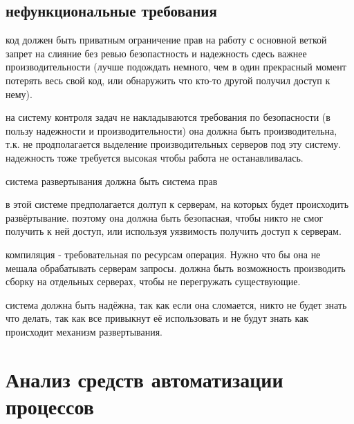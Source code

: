 \documentclass{article}
\begin{document}
\subsection{нефункциональные требования}
код должен быть приватным
ограничение прав на работу с основной веткой
запрет на слияние без ревью
безопастность и надежность сдесь важнее производительности (лучше подождать немного, чем в один прекрасный момент потерять весь свой код, или обнаружить что кто-то другой получил доступ к нему).

на систему контроля задач не накладываются требования по безопасности (в пользу надежности и производительности)
она должна быть производительна, т.к. не продполагается выделение производительных серверов под эту систему.
надежность тоже требуется высокая чтобы работа не останавливалась.

система развертывания
 должна быть система прав

 в этой системе предполагается долтуп к серверам, на которых будет происходить развёртывание.
 поэтому она должна быть безопасная, чтобы никто не смог получить к ней доступ, или используя уязвимость
 получить доступ к серверам.

 компиляция - требовательная по ресурсам операция. Нужно что бы она не мешала обрабатывать серверам запросы.
 должна быть возможность производить сборку на отдельных серверах, чтобы не перегружать существующие.

 система должна быть надёжна, так как если она сломается, никто не будет знать что делать, так как все привыкнут
 её использовать и не будут знать как происходит механизм развертывания.


\pagebreak


\section{Анализ средств автоматизации процессов}

\pagebreak
\end{document}
